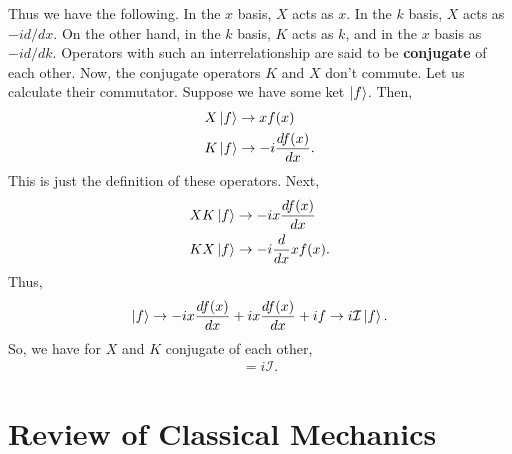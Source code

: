 \documentclass{book}
\theoremstyle{definition}
\newcommand{\f}[2]{\frac{#1}{#2}}
\newcommand{\Id}{\mathcal{I}}
\begin{document}
Thus we have the following. In the $x$ basis, $X$ acts as $x$. In the $k$ basis, $X$ acts as $-id/dx$. On the other hand, in the $k$ basis, $K$ acts as $k$, and in the $x$ basis as $-id/dk$. Operators with such an interrelationship are said to be \textbf{conjugate} of each other. Now, the conjugate operators $K$ and $X$ don't commute. Let us calculate their commutator. Suppose we have some ket $\ket{f}$. Then,
\begin{align}
&X\ket{f} \to xf(x)\\
&K\ket{f} \to -i\f{df(x)}{dx}.
\end{align} 
This is just the definition of these operators. Next,
\begin{align}
&XK\ket{f} \to -i x \f{df(x)}{dx}\\
&KX\ket{f} \to -i\f{d}{dx}xf(x).
\end{align}
Thus, 
\begin{align}
[X,K]\ket{f} \to -i x \f{df(x)}{dx} + i x \f{df(x)}{dx} + if \to i\Id\ket{f}.
\end{align}
So, we have for $X$ and $K$ conjugate of each other,
\begin{align}
[X,K] = i\Id.
\end{align}
























































\newpage


\section{Review of Classical Mechanics}
\end{document}
